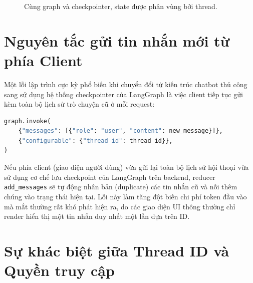 \begin{figure}[H]
\centering
{}
\caption{Cùng graph và checkpointer, state được phân vùng bởi thread.}
\label{fig:two-threads}
\end{figure}

\section{Nguyên tắc gửi tin nhắn mới từ phía Client}

Một lỗi lập trình cực kỳ phổ biến khi chuyển đổi từ kiến trúc chatbot thủ công sang sử dụng hệ thống checkpointer của LangGraph là việc client tiếp tục gửi kèm toàn bộ lịch sử trò chuyện cũ ở mỗi request:

\begin{lstlisting}[language=Python,caption={Input đúng khi backend sở hữu history}]
graph.invoke(
    {"messages": [{"role": "user", "content": new_message}]},
    {"configurable": {"thread_id": thread_id}},
)
\end{lstlisting}

\begin{aiwarning}
Nếu phía client (giao diện người dùng) vừa gửi lại toàn bộ lịch sử hội thoại vừa sử dụng cơ chế lưu checkpoint của LangGraph trên backend, reducer \texttt{add\_messages} sẽ tự động nhân bản (duplicate) các tin nhắn cũ và nối thêm chúng vào trạng thái hiện tại. Lỗi này làm tăng đột biến chi phí token đầu vào mà mắt thường rất khó phát hiện ra, do các giao diện UI thông thường chỉ render hiển thị một tin nhắn duy nhất một lần dựa trên ID.
\end{aiwarning}

\section{Sự khác biệt giữa Thread ID và Quyền truy cập}

